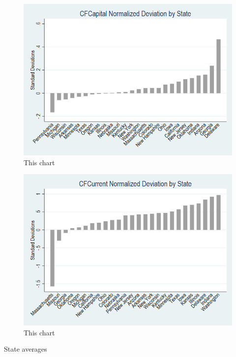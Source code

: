 
\begin{figure}[H]
    \centering
    \includegraphics[width=.75\linewidth]{_fig/norm_dev_sfc.png}
    \captionsetup{width=0.80\textwidth}
    \caption{\label{fig:app:ten}
     This chart }
\end{figure}
\clearpage


\begin{figure}[H]
    \centering
    \includegraphics[width=.75\linewidth]{_fig/norm_dev_cfc.png}
    \captionsetup{width=0.80\textwidth}
    \caption{\label{fig:app:11}
     This chart }
\end{figure}
\clearpage

\begin{table}[H]
    \centering
    \scriptsize
    
    \caption{\label{tab:table1} State averages}
\end{table}



